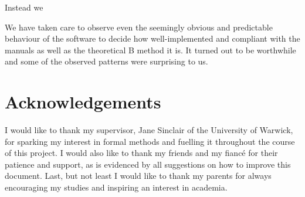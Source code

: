 \documentclass[11pt,journal]{IEEEtran}
\begin{document}
	Instead we 
	
	We have taken care to observe even the seemingly obvious and predictable behaviour of the software to decide how well-implemented and compliant with the manuals as well as the theoretical B method it is. It turned out to be worthwhile and some of the observed patterns were surprising to us.

	
	\section{Acknowledgements}
	I would like to thank my supervisor, Jane Sinclair of the University of Warwick, for sparking my interest in formal methods and fuelling it throughout the course of this project. I would also like to thank my friends and my fianc\'{e} for their patience and support, as is evidenced by all suggestions on how to improve this document. Last, but not least I would like to thank my parents for always encouraging my studies and inspiring an interest in academia.
	
	\IEEEPARstart{}{} 
	\pagebreak
\end{document}
